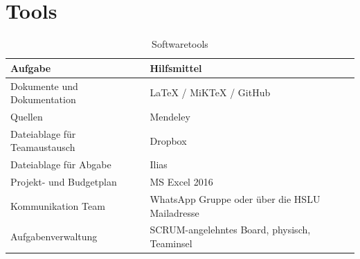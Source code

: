 \documentclass[a4paper]{report}
\begin{document}
\section{Tools}
\label{sec:Tools}
\begin{table}[h!]
	\begin{tabular}{|p{}|p{}|}
		\hline
		\textbf{Aufgabe} & \textbf{Hilfsmittel} \\
		\hline
		Dokumente und Dokumentation & LaTeX / MiKTeX / GitHub \\
		\hline
		Quellen & Mendeley \\
		\hline
		Dateiablage für Teamaustausch & Dropbox \\
		\hline
		Dateiablage für Abgabe & Ilias \\
		\hline
		Projekt- und Budgetplan & MS Excel 2016 \\
		\hline
		Kommunikation Team & WhatsApp Gruppe oder über die HSLU Mailadresse\\
		\hline
		Aufgabenverwaltung & SCRUM-angelehntes Board, physisch, Teaminsel\\
		\hline
	\end{tabular}
	\caption{Softwaretools}
	\label{tab:SWTools}
\end{table}

\newpage
\end{document}
